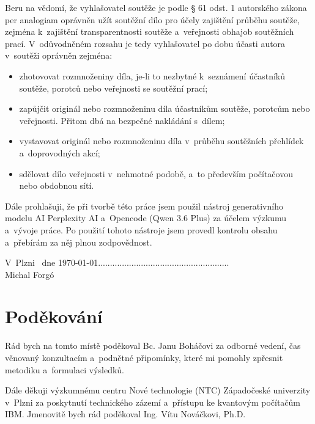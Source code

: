 \documentclass[12pt, a4paper]{report}
\newcommand{\autor}{Michal Forgó}
\begin{document}
Beru na vědomí, že vyhlašovatel soutěže je podle § 61 odst.
1 autorského zákona per analogiam oprávněn užít soutěžní dílo pro účely zajištění průběhu soutěže, zejména k~zajištění transparentnosti soutěže a~veřejnosti obhajob soutěžních prací.
V~odůvodněném rozsahu je tedy vyhlašovatel po dobu účasti autora v~soutěži oprávněn zejména:
\begin{itemize}
    \item zhotovovat rozmnoženiny díla, je-li to nezbytné k~seznámení účastníků soutěže, porotců nebo veřejnosti se soutěžní prací;
    \item zapůjčit originál nebo rozmnoženinu díla účastníkům soutěže, porotcům nebo veřejnosti. Přitom dbá na bezpečné nakládání s~dílem;
    \item vystavovat originál nebo rozmnoženinu díla v~průběhu soutěžních přehlídek a~doprovodných akcí;
    \item sdělovat dílo veřejnosti v~nehmotné podobě, a~to především počítačovou nebo obdobnou sítí.
\end{itemize}


Dále prohlašuji, že při tvorbě této práce jsem použil nástroj generativního modelu AI Perplexity AI a~Opencode (Qwen 3.6 Plus) za účelem výzkumu a~vývoje práce. Po použití tohoto nástroje jsem provedl kontrolu obsahu a~přebírám za něj plnou zodpovědnost.
\vspace{2cm}

V~Plzni \ dne \today \hfill .......................................................\\
\hspace*{10cm} \autor
\newpage
\thispagestyle{empty}
\section*{Poděkování}

Rád bych na tomto místě poděkoval Bc. Janu Boháčovi za odborné vedení,
čas věnovaný konzultacím a~podnětné připomínky, které mi pomohly zpřesnit
metodiku a~formulaci výsledků.

Dále děkuji výzkumnému centru Nové technologie (NTC) Západočeské univerzity
v~Plzni za poskytnutí technického zázemí a~přístupu ke kvantovým počítačům
IBM. Jmenovitě bych rád poděkoval Ing. Vítu Nováčkovi, Ph.D.


\newpage
\thispagestyle{empty}
\end{document}
